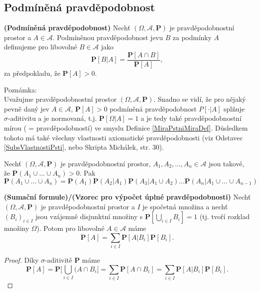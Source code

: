 \subsection{Podmíněná pravděpodobnost}
\begin{definition}\textbf{(Podmíněná pravděpodobnost)}\label{podm_pst}
Nechť $( \Omega, \mathcal{A}, \textbf{P})$ je pravděpodobnostní prostor a $A \in \mathcal{A}$. Podmíněnou pravděpodobnost  jevu $B$ za podmínky $A$ definujeme pro libovolné $B \in \mathcal{A}$ jako
\begin{equation}
\textbf{P}[B|A] = \frac{\textbf{P}[A \cap B]}{\textbf{P}[A]},
\end{equation}
za předpokladu, že $ \textbf{P}[A] > 0 $.
\end{definition}

Poznámka: \\
Uvažujme pravděpodobnostní prostor $( \Omega, \mathcal{A}, \textbf{P})$. Snadno se vidí, že pro nějaký pevně daný jev $A \in \mathcal{A}$, $\textbf{P}[A] > 0$ podmíněná pravděpodobnost $P[\cdot | A] $ splňuje $\sigma$-aditivitu a je normovaná, t.j. $\textbf{P}[\Omega | A] = 1$ a je tedy také pravděpodobnostní mírou ( = pravděpodobností) ve smyslu Definice \ref{MiraPstniMiraDef}. Důsledkem tohoto má také všechny vlastnosti axiomatické pravděpodobnosti (viz Odstavec \ref{SubsVlastnostiPsti}, nebo Skripta Michálek, str. 30).
\begin{theorem}
Nechť $(\Omega,\mathcal{A},\textbf{P})$ je pravděpodobnostní prostor, $A_1,A_2,\ldots,A_n \in \mathcal{A}$ jsou takové, že $\textbf{P}(A_1\cup \ldots \cup A_n) > 0$. Pak
\begin{equation*}
\textbf{P}(A_1\cup \ldots \cup A_n) =\textbf{P}(A_1)\textbf{P}(A_2|A_1)\textbf{P}(A_3|A_1\cup A_2)\ldots \textbf{P}(A_n|A_1\cup \ldots \cup A_{n-1})
\end{equation*}
\end{theorem}

\begin{theorem}\label{PodmPSumForm}\textbf{(Sumační formule)/(Vzorec pro výpočet úplné pravděpodobnosti)} Nechť $( \Omega, \mathcal{A}, \textbf{P})$ je pravděpodobnostní prostor a $I$ je spočetná množina a nechť $(B_{i})_{i \in I}$ jsou vzájemně disjunktní množiny s $\textbf{P}[\bigcup_{i \in I}B_{i}] = 1$ (tj. tvoří rozklad množiny $\Omega$). Potom pro libovolné $A \in \mathcal{A}$ máme
\begin{equation}
\textbf{P}[A] = \sum_{i \in I}\textbf{P}[A | B_{i}]\textbf{P}[B_{i}].
\end{equation}
\end{theorem}
\begin{proof}
Díky $\sigma$-aditivitě $\textbf{P}$ máme
\begin{equation}
\textbf{P}[A] = \textbf{P}\bigg[ \bigcup_{i \in I}(A \cap B_{i} \bigg] = \sum_{i\in I} \textbf{P}[A \cap B_{i}] = \sum_{i \in I}\textbf{P}[A|B_{i}]\textbf{P}[B_{i}].
\end{equation}
\end{proof}

